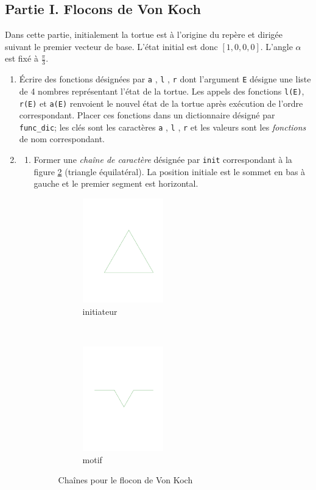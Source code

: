 \subsection*{Partie I. Flocons de Von Koch}
Dans cette partie, initialement la tortue est à l'origine du repère et dirigée suivant le premier vecteur de base. L'état initial est donc $[1,0,0,0]$. L'angle $\alpha$ est fixé à $\frac{\pi}{3}$. 
\begin{enumerate}
\item
\'Ecrire des fonctions désignées par \verb|a| , \verb|l| , \verb|r| dont l'argument \verb|E| désigne une liste de 4 nombres représentant l'état de la tortue.\newline
Les appels des fonctions \verb|l(E)|, \verb|r(E)| et \verb|a(E)| renvoient le nouvel état de la tortue après exécution de l'ordre correspondant. Placer ces fonctions dans un dictionnaire désigné par \verb|func_dic|; les clés sont les caractères \verb|a| , \verb|l| , \verb|r| et les valeurs sont les \emph{fonctions} de nom correspondant. 

 \item \begin{enumerate}
\item Former une \emph{chaîne de caractère} désignée par \verb|init| correspondant à la figure \ref{fig:Ereecriture_2} (triangle équilatéral). La position initiale est le sommet en bas à gauche et le premier segment est horizontal.

\begin{figure}[ht]
 \centering
 \begin{subfigure}[b]{4cm}
   \includegraphics[width=3.5cm]{Ereecriture_2_fig.pdf}
   \caption{initiateur}  
 \end{subfigure} ~
 \begin{subfigure}[b]{4cm}
   \includegraphics[width=3.5cm]{Ereecriture_3_fig.pdf}
   \caption{motif}\label{fig:Ereecriture_3} 
  \end{subfigure}
  \caption{Chaînes pour le flocon de Von Koch} \label{fig:Ereecriture_2}
\end{figure}


\end{enumerate}
\end{enumerate}
